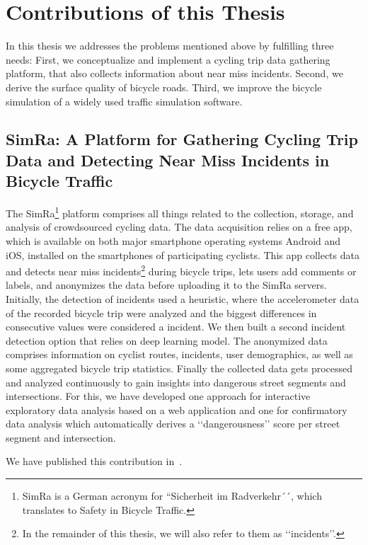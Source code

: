 \section{Contributions of this Thesis}
\label{sec:contributions}
In this thesis we addresses the problems mentioned above by fulfilling three needs:
First, we conceptualize and implement a cycling trip data gathering platform, that also collects information about near miss incidents.
Second, we derive the surface quality of bicycle roads.
Third, we improve the bicycle simulation of a widely used traffic simulation software.

\subsection{SimRa: A Platform for Gathering Cycling Trip Data and Detecting Near Miss Incidents in Bicycle Traffic}
\label{subsec:simra_contribution}
The SimRa\footnote{SimRa is a German acronym for ``Sicherheit im Radverkehr´´, which translates to Safety in Bicycle Traffic.} platform comprises all things related to the collection, storage, and analysis of crowdsourced cycling data.
The data acquisition relies on a free app, which is available on both major smartphone operating systems Android and iOS, installed on the smartphones of participating cyclists.
This app collects data and detects near miss incidents\footnote{In the remainder of this thesis, we will also refer to them as ‘‘incidents’’.} during bicycle trips, lets users add comments or labels, and anonymizes the data before uploading it to the SimRa servers.
Initially, the detection of incidents used a heuristic, where the accelerometer data of the recorded bicycle trip were analyzed and the biggest differences in consecutive values were considered a incident.
We then built a second incident detection option that relies on deep learning model.
The anonymized data comprises information on cyclist routes, incidents, user demographics, as well as some aggregated bicycle trip statistics.
Finally the collected data gets processed and analyzed continuously to gain insights into dangerous street segments and intersections.
For this, we have developed one approach for interactive exploratory data analysis based on a web application and one for confirmatory data analysis which automatically derives a ‘‘dangerousness’’ score per street segment and intersection. 

We have published this contribution in~\cite{karakaya2020simra,karakaya2022cyclesense}.

